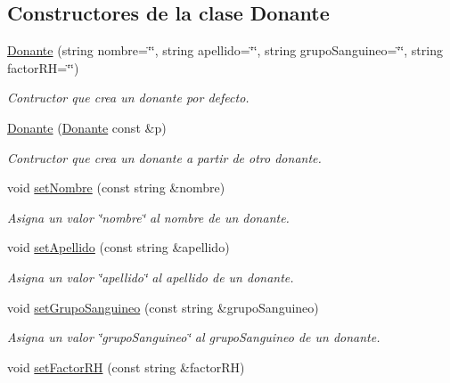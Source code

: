 \subsection*{Constructores de la clase Donante}
\begin{DoxyCompactItemize}
\item 
\hyperlink{classed_1_1Donante_ab60c71e2630bce8681331aadf024bced}{Donante} (string nombre=\char`\"{}\char`\"{}, string apellido=\char`\"{}\char`\"{}, string grupo\-Sanguineo=\char`\"{}\char`\"{}, string factor\-R\-H=\char`\"{}\char`\"{})
\begin{DoxyCompactList}\small\item\em Contructor que crea un donante por defecto. \end{DoxyCompactList}\item 
\hyperlink{classed_1_1Donante_a10e4c4449297d461df58b6adb3765584}{Donante} (\hyperlink{classed_1_1Donante}{Donante} const \&p)
\begin{DoxyCompactList}\small\item\em Contructor que crea un donante a partir de otro donante. \end{DoxyCompactList}\item 
void \hyperlink{classed_1_1Donante_a346b31e40b478d25c3e311de2ff2fb2c}{set\-Nombre} (const string \&nombre)
\begin{DoxyCompactList}\small\item\em Asigna un valor \char`\"{}nombre\char`\"{} al nombre de un donante. \end{DoxyCompactList}\item 
void \hyperlink{classed_1_1Donante_ae1404d01bdc865c03bfc179b408df4d7}{set\-Apellido} (const string \&apellido)
\begin{DoxyCompactList}\small\item\em Asigna un valor \char`\"{}apellido\char`\"{} al apellido de un donante. \end{DoxyCompactList}\item 
void \hyperlink{classed_1_1Donante_a24dcea06d8dd84d596e115b8c94e8eb2}{set\-Grupo\-Sanguineo} (const string \&grupo\-Sanguineo)
\begin{DoxyCompactList}\small\item\em Asigna un valor \char`\"{}grupo\-Sanguineo\char`\"{} al grupo\-Sanguineo de un donante. \end{DoxyCompactList}\item 
void \hyperlink{classed_1_1Donante_a724f1dcdf7a3cf78fd80151b30038c74}{set\-Factor\-R\-H} (const string \&factor\-R\-H)

\end{DoxyCompactItemize}
